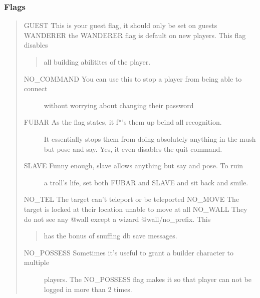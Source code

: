 \documentclass[letterpaper,10pt,english]{sphinxmanual}
\begin{document}
\subsubsection{Flags}
\label{\detokenize{security:flags}}\begin{quote}

\sphinxAtStartPar
GUEST    \sphinxhyphen{} This is your guest flag, it should only be set on guests
WANDERER \sphinxhyphen{} the WANDERER flag is default on new players.  This flag disables
\begin{quote}

\sphinxAtStartPar
all building abilitites of the player.
\end{quote}
\begin{description}
\item[{NO\_COMMAND \sphinxhyphen{} You can use this to stop a player from being able to connect}] \leavevmode
\sphinxAtStartPar
without worrying about changing their password

\item[{FUBAR      \sphinxhyphen{} As the flag states, it f*’s them up beind all recognition.}] \leavevmode
\sphinxAtStartPar
It essentially stops them from doing absolutely anything in the
mush but pose and say.  Yes, it even disables the quit command.

\item[{SLAVE      \sphinxhyphen{} Funny enough, slave allows anything but say and pose.  To ruin}] \leavevmode
\sphinxAtStartPar
a troll’s life, set both FUBAR and SLAVE and sit back and smile.

\end{description}

\sphinxAtStartPar
NO\_TEL     \sphinxhyphen{} The target can’t teleport or be teleported
NO\_MOVE    \sphinxhyphen{} The target is locked at their location unable to move at all
NO\_WALL    \sphinxhyphen{} They do not see any @wall except a wizard @wall/no\_prefix.  This
\begin{quote}

\sphinxAtStartPar
has the bonus of snuffing db save messages.
\end{quote}
\begin{description}
\item[{NO\_POSSESS \sphinxhyphen{} Sometimes it’s useful to grant a builder character to multiple}] \leavevmode
\sphinxAtStartPar
players.  The NO\_POSSESS flag makes it so that player can not
be logged in more than 2 times.

\end{description}


\end{quote}
\end{document}
